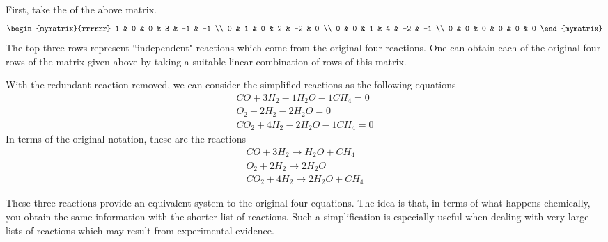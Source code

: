 First, take the {\rref} of the above matrix.
\begin{equation*}
\begin{mymatrix}{rrrrrr}
1 & 0 & 0 & 3 & -1 & -1 \\
0 & 1 & 0 & 2 & -2 & 0 \\
0 & 0 & 1 & 4 & -2 & -1 \\
0 & 0 & 0 & 0 & 0 & 0
\end{mymatrix}
\end{equation*}
The top three rows represent \textquotedblleft independent" reactions which
come from the original four reactions. One can obtain each of the original
four rows of the  matrix given above by taking a suitable
linear combination of rows of this {\rref} matrix.

With the redundant reaction removed, we can consider the simplified reactions as the following equations
\begin{equation*}
\begin{array}{c}
CO+3H_{2}-1H_{2}O-1CH_{4}=0 \\
O_{2}+2H_{2}-2H_{2}O=0 \\
CO_{2}+4H_{2}-2H_{2}O-1CH_{4}=0
\end{array}
\end{equation*}
In terms of the original notation, these are the reactions
\begin{equation*}
\begin{array}{c}
CO+3H_{2}\rightarrow H_{2}O+CH_{4} \\
O_{2}+2H_{2}\rightarrow 2H_{2}O \\
CO_{2}+4H_{2}\rightarrow 2H_{2}O+CH_{4}
\end{array}
\end{equation*}

These three reactions provide an equivalent system to the original four equations. The idea is that, in terms of what happens chemically, you
obtain the same information with the shorter list of reactions. Such a simplification is especially useful when dealing with very large lists of reactions which may result from experimental evidence.
